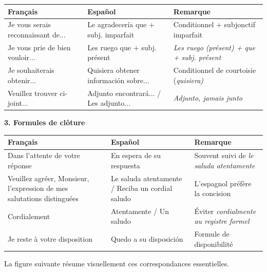 \documentclass[11pt]{article}
\newcommand{\esp}[1]{\ifmmode\text{\textit{#1}}\else\begingroup\selectlanguage{spanish}\itshape #1\endgroup\fi}
\begin{document}
\begin{center}
\begin{tabularx}{\linewidth}{|X|X|X|}
\hline
\rowcolor{popgreenL} Français & Español & Remarque \\
\hline
Je vous serais reconnaissant de... & Le agradecería que + subj. imparfait & Conditionnel + subjonctif imparfait \\
\hline
Je vous prie de bien vouloir... & Les ruego que + subj. présent & \esp{Les ruego} (présent) + \esp{que} + subj. présent \\
\hline
Je souhaiterais obtenir... & Quisiera obtener información sobre... & Conditionnel de courtoisie (\esp{quisiera}) \\
\hline
Veuillez trouver ci-joint... & Adjunto encontrará... / Les adjunto... & \esp{Adjunto}, jamais \esp{junto} \\
\hline
\end{tabularx}
\end{center}

\textbf{3. Formules de clôture}

\begin{center}
\begin{tabularx}{\linewidth}{|X|X|X|}
\hline
\rowcolor{poporangeL} Français & Español & Remarque \\
\hline
Dans l'attente de votre réponse & En espera de su respuesta & Souvent suivi de \esp{le saluda atentamente} \\
\hline
Veuillez agréer, Monsieur, l'expression de mes salutations distinguées & Le saluda atentamente / Reciba un cordial saludo & L'espagnol préfère la concision \\
\hline
Cordialement & Atentamente / Un saludo & Éviter \esp{cordialmente} au registre formel \\
\hline
Je reste à votre disposition & Quedo a su disposición & Formule de disponibilité \\
\hline
\end{tabularx}
\end{center}

La figure suivante résume visuellement ces correspondances essentielles.
\end{document}
